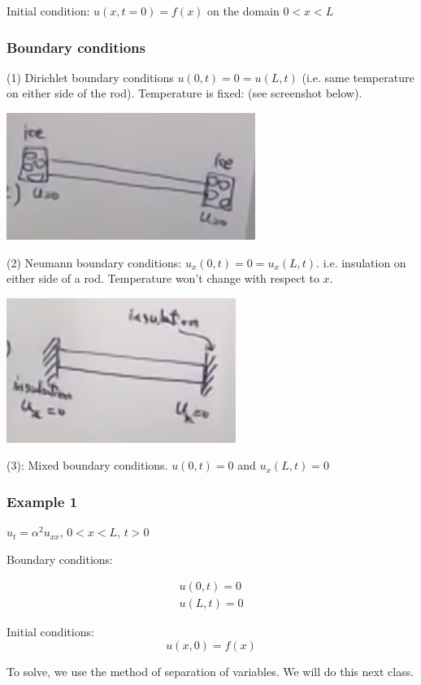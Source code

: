 Initial condition: $u(x,t = 0) = f(x)$ on the domain $0 < x < L$

\subsubsection{Boundary conditions}

(1) Dirichlet boundary conditions $u(0,t) = 0 = u(L,t)$ (i.e. same temperature on either side of the rod). Temperature is fixed: (see screenshot below). 

\includegraphics[width = 0.5 \textwidth]{image4.png}

(2) Neumann boundary conditions: $u_x (0,t) = 0 = u_x (L,t)$. i.e. insulation on either side of a rod. Temperature won't change with respect to $x$. 

\includegraphics[width = 0.5 \textwidth]{image5.png}

(3): Mixed boundary conditions. $u(0,t) = 0$ and $u_x (L,t) = 0$

\subsubsection{Example 1}
\begin{center}
    $u_t = \alpha^2 u_{xx}$, $0 < x < L$, $t > 0$
\end{center}


Boundary conditions:

$$\begin{matrix} u(0,t) = 0 \\ u(L,t) = 0 \end{matrix}$$

Initial conditions: $$u(x,0) = f(x)$$

To solve, we use the method of separation of variables. We will do this next class. 
